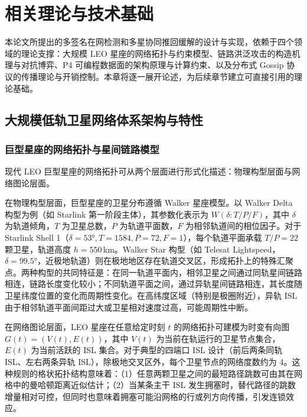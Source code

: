 \chapter{相关理论与技术基础}

本论文所提出的多签名在网检测和多星协同推回缓解的设计与实现，依赖于四个领域的理论支撑：大规模 LEO 星座的网络拓扑与约束模型、链路洪泛攻击的构造机理与对抗博弈、P4 可编程数据面的架构原理与计算约束、以及分布式 Gossip 协议的传播理论与开销控制。本章将逐一展开论述，为后续章节建立可直接引用的理论基础。

\section{大规模低轨卫星网络体系架构与特性}

\subsection{巨型星座的网络拓扑与星间链路模型}

现代 LEO 巨型星座的网络拓扑可从两个层面进行形式化描述：物理构型层面与网络图论层面。

在物理构型层面，巨型星座的卫星分布遵循 Walker 星座模型。以 Walker Delta 构型为例（如 Starlink 第一阶段主体），其参数化表示为 $W(\delta: T/P/F)$，其中 $\delta$ 为轨道倾角，$T$ 为卫星总数，$P$ 为轨道平面数，$F$ 为相邻轨道间的相位因子。对于 Starlink Shell 1（$\delta=53°, T=1584, P=72, F=1$），每个轨道平面承载 $T/P = 22$ 颗卫星，轨道高度 $h = 550$\,km。Walker Star 构型（如 Telesat Lightspeed，$\delta=99.5°$，近极地轨道）则在极地地区存在轨道交叉区，形成拓扑上的特殊汇聚点。两种构型的共同特征是：在同一轨道平面内，相邻卫星之间通过同轨星间链路相连，链路长度变化较小；不同轨道平面之间，通过异轨星间链路相连，其长度随卫星纬度位置的变化而周期性变化。在高纬度区域（特别是极圈附近），异轨 ISL 由于相邻轨道平面间距过大或卫星相对速度过高，可能周期性中断。

在网络图论层面，LEO 星座在任意给定时刻 $t$ 的网络拓扑可建模为时变有向图 $G(t) = (V(t), E(t))$，其中 $V(t)$ 为当前在轨运行的卫星节点集合，$E(t)$ 为当前活跃的 ISL 集合。对于典型的四端口 ISL 设计（前后两条同轨 ISL、左右两条异轨 ISL），除极地交叉区外，每个卫星节点的网络度数约为 4。这种规则的格状拓扑结构意味着：（1）任意两颗卫星之间的最短路径跳数可由其在网格中的曼哈顿距离近似估计；（2）当某条主干 ISL 发生拥塞时，替代路径的跳数增量相对可控，但同时也意味着拥塞可能沿网格的行或列方向传播，引发连锁效应。

